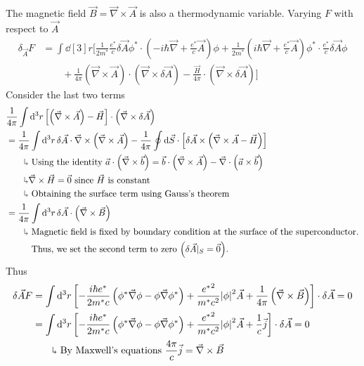 \documentclass[12pt,a4paper,titlepage]{article}
\newcommand{\trm}[1]{\textrm{#1}} %
\newcommand{\explain}{\quad\rotatebox[origin=c]{180}{$\Lsh$}} %
\begin{document}
The magnetic field $\vec{B}=\vec{\nabla}\times\vec{A}$ is also a thermodynamic variable. Varying $F$ with respect to $\vec{A}$
\begin{equation}
\begin{aligned}
\delta_{\vec{A}}F&=\int\dd[3]{r}\bigg[\frac{1}{2m^{*}}\frac{e^{*}}{c}\delta\vec{A}\phi^{*}\cdot\left(-i\hbar\vec{\nabla}+\frac{e^{*}}{c}\vec{A}\right)\phi+\frac{1}{2m^{*}}\left(i\hbar\vec{\nabla}+\frac{e^{*}}{c}\vec{A}\right)\phi^{*}\cdot\frac{e^{*}}{c}\delta\vec{A}\phi\\
&\qquad+\frac{1}{4\pi}\left(\vec{\nabla}\times\vec{A}\right)\cdot\left(\vec{\nabla}\times\delta\vec{A}\right)-\frac{\vec{H}}{4\pi}\cdot\left(\vec{\nabla}\times\delta\vec{A}\right)\bigg]
\end{aligned}
\end{equation}
Consider the last two terms
\begin{equation}
\begin{aligned}
&\frac{1}{4\pi}\int\dd[3]{r}\left[\left(\vec{\nabla}\times\vec{A}\right)-\vec{H}\right]\cdot\left(\vec{\nabla}\times\delta\vec{A}\right)\\
&=\frac{1}{4\pi}\int\dd[3]{r}\delta\vec{A}\cdot\vec{\nabla}\times\left(\vec{\nabla}\times\vec{A}\right)-\frac{1}{4\pi}\oint\dd{\vec{S}}\cdot\left[\delta\vec{A}\times\left(\vec{\nabla}\times\vec{A}-\vec{H}\right)\right]\\
&\quad\explain\trm{ Using the identity $\vec{a}\cdot\left(\vec{\nabla}\times\vec{b}\right)=\vec{b}\cdot\left(\vec{\nabla}\times\vec{A}\right)-\vec{\nabla}\cdot\left(\vec{a}\times\vec{b}\right)$}\\
&\quad\explain\vec{\nabla}\times\vec{H}=\vec{0}\trm{ since $\vec{H}$ is constant}\\
&\quad\explain\trm{ Obtaining the surface term using Gauss's theorem}\\
&=\frac{1}{4\pi}\int\dd[3]{r}\delta\vec{A}\cdot\left(\vec{\nabla}\times\vec{B}\right)\\
&\quad\explain\trm{ Magnetic field is fixed by boundary condition at the surface of the superconductor.}\\
&\hphantom{\quad\explain}\trm{ Thus, we set the second term to zero $\left(\delta\vec{A}|_{S}=\vec{0}\right)$.}
\end{aligned}
\end{equation}
Thus
\begin{equation}
\begin{aligned}
\delta\vec{A}F&=\int\dd[3]{r}\left[-\frac{i\hbar e^{*}}{2m^{*}c}\left(\phi^{*}\vec{\nabla}\phi-\phi\vec{\nabla}\phi^{*}\right)+\frac{{e^{*}}^{2}}{m^{*}c^{2}}\abs{\phi}^{2}\vec{A}+\frac{1}{4\pi}\left(\vec{\nabla}\times\vec{B}\right)\right]\cdot\delta\vec{A}=0\\
&=\int\dd[3]{r}\left[-\frac{i\hbar e^{*}}{2m^{*}c}\left(\phi^{*}\vec{\nabla}\phi-\phi\vec{\nabla}\phi^{*}\right)+\frac{{e^{*}}^{2}}{m^{*}c^{2}}\abs{\phi}^{2}\vec{A}+\frac{1}{c}\vec{j}\right]\cdot\delta\vec{A}=0\\
&\quad\explain\trm{ By Maxwell's equations $\frac{4\pi}{c}\vec{j}=\vec{\nabla}\times\vec{B}$}
\end{aligned}
\end{equation}
\end{document}
